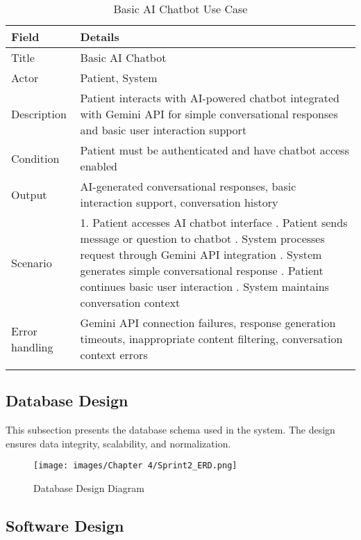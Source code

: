 \begin{longtable}{|p{3cm}|p{12cm}|}
\hline
\textbf{Field} & \textbf{Details} \\
\hline
Title & Basic AI Chatbot \\
\hline
Actor & Patient, System \\
\hline
Description & Patient interacts with AI-powered chatbot integrated with Gemini API for simple conversational responses and basic user interaction support \\
\hline
Condition & Patient must be authenticated and have chatbot access enabled \\
\hline
Output & AI-generated conversational responses, basic interaction support, conversation history \\
\hline
Scenario & 1. Patient accesses AI chatbot interface \newline 2. Patient sends message or question to chatbot \newline 3. System processes request through Gemini API integration \newline 4. System generates simple conversational response \newline 5. Patient continues basic user interaction \newline 6. System maintains conversation context \\
\hline
Error handling & Gemini API connection failures, response generation timeouts, inappropriate content filtering, conversation context errors \\
\hline
\caption{Basic AI Chatbot Use Case}
\end{longtable}
\newpage

\subsection{Database Design}

This subsection presents the database schema used in the system. The design ensures data integrity, scalability, and normalization.
 
\vfill
\begin{figure}[H]
    \centering
    \texttt{[image: images/Chapter 4/Sprint2\_ERD.png]}
    \caption{Database Design Diagram}
    \label{fig:database-design}
\end{figure}



\vfill
\newpage

\subsection{Software Design}


